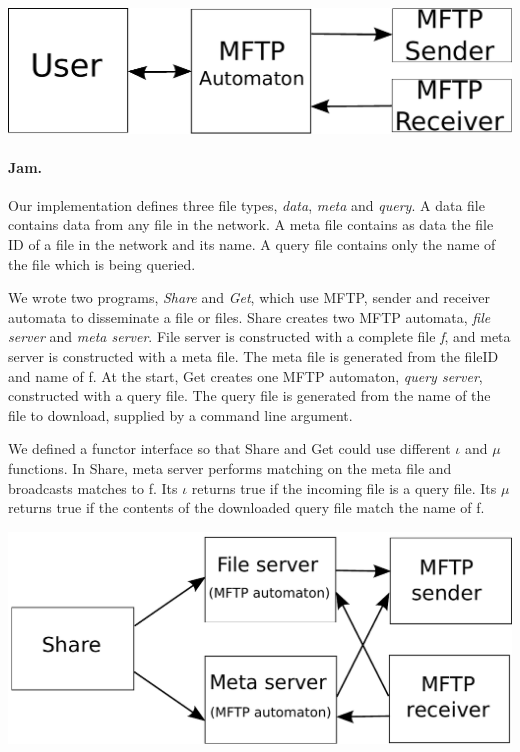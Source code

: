 \documentclass[letterpaper]{article}
\begin{document}
\vspace{5mm}
\includegraphics[scale=0.65]{diagramOne}

\paragraph{Jam.} %
Our implementation defines three file types, \emph{data}, \emph{meta} and \emph{query}.  
A data file contains data from any file in the network.
A meta file contains as data the file ID of a file in the network and its name. 
A query file contains only the name of the file which is being queried.

We wrote two programs, \emph{Share} and \emph{Get}, which use MFTP, sender and receiver automata to disseminate a file or files. %
Share creates two MFTP automata, \emph{file server} and \emph{meta server}.
File server is constructed with a complete file \emph{f}, and meta server is constructed with a meta file.
The meta file is generated from the fileID and name of f.
At the start, Get creates one MFTP automaton, \emph{query server}, constructed with a query file.
The query file is generated from the name of the file to download, supplied by a command line argument.

We defined a functor interface so that Share and Get could use different $\iota$ and $\mu$ functions.
In Share, meta server performs matching on the meta file and broadcasts matches to f.
Its $\iota$ returns true if the incoming file is a query file.
Its $\mu$ returns true if the contents of the downloaded query file match the name of f.

\vspace{2 mm}

\includegraphics[scale=0.55]{share_diagram}
\end{document}
